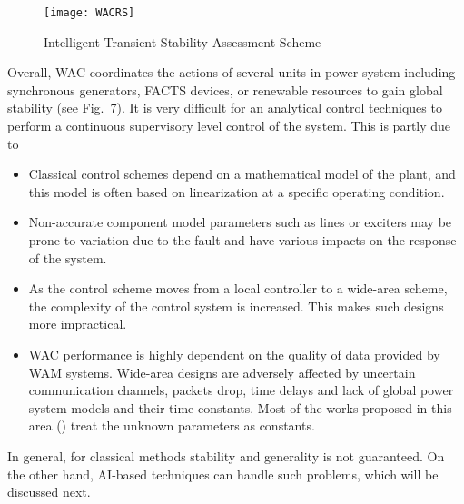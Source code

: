 \documentclass[journal]{IEEEtran}
\begin{document}
\begin{figure}
\centering
\texttt{[image: WACRS]}
\caption{Intelligent Transient Stability Assessment Scheme}
\label{fig:Intelligent}
\end{figure}


Overall, WAC coordinates the actions of several units in power system including synchronous generators, FACTS devices, or renewable resources to gain global stability (see Fig.~7). It is very difficult for an analytical control techniques to perform a continuous supervisory level control of the system. This is partly due to 
\begin{itemize}
  \setlength\itemsep{-0.2em}
\item Classical control schemes depend on a mathematical model of the plant, and this model is often based on linearization at a specific operating condition.
\item Non-accurate component model parameters such as lines \cite{7173406} or exciters \cite{6808113} may be prone to variation due to the fault and have various impacts on the response of the system.
\item As the control scheme moves from a local controller to a wide-area scheme, the complexity of the control system is increased. This makes such designs more impractical.
\item WAC performance is highly dependent on the quality of data provided by WAM systems. Wide-area designs are adversely affected by uncertain communication channels, packets drop, time delays and lack of global power system models and their time constants. Most of the works proposed in this area (\cite{4596348, 4436106, 1350833, 4162611}) treat the unknown parameters as constants. 
\end{itemize}
In general, for classical methods stability and generality is not guaranteed. On the other hand, AI-based techniques can handle such problems, which will be discussed next. 
\end{document}
